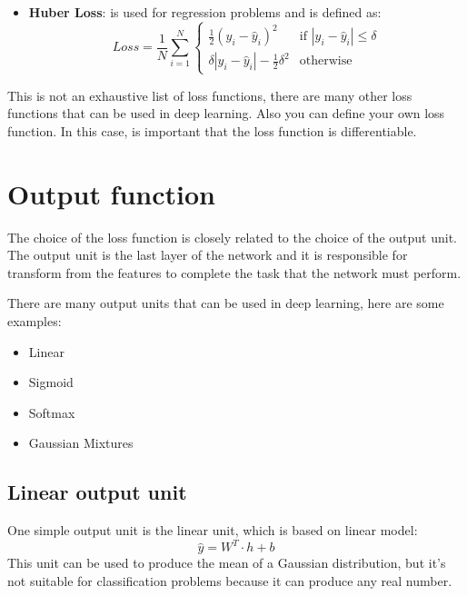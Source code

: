 \begin{itemize}
\begin{itemize}
              \item \textbf{Huber Loss}: is used for regression problems and is
                    defined as:
                    \begin{equation}
                        Loss = \frac{1}{N} \sum_{i=1}^N \begin{cases}
                            \frac{1}{2}(y_i - \hat{y}_i)^2                  & \text{if } |y_i - \hat{y}_i| \leq \delta \\
                            \delta |y_i - \hat{y}_i| - \frac{1}{2} \delta^2 & \text{otherwise}
                        \end{cases}
                    \end{equation}
          \end{itemize}
\end{itemize}
\begin{note}
    This is not an exhaustive list of loss functions, there are many other loss
    functions that can be used in deep learning. Also you can define your own loss
    function. In this case, is important that the loss function is differentiable.
\end{note}
\section{Output function}
The choice of the loss function is closely related to the choice of the output
unit. The output unit is the last layer of the network and it is responsible for
transform from the features to complete the task that the network must perform.

There are many output units that can be used in deep learning, here are some examples:
\begin{itemize}
    \item Linear
    \item Sigmoid
    \item Softmax
    \item Gaussian Mixtures
\end{itemize}
\subsection{Linear output unit}
One simple output unit is the linear unit, which is based on linear model:
\begin{equation}
    \hat{y} = W^T \cdot h + b
\end{equation}
This unit can be used to produce the mean of a Gaussian distribution, but it's
not suitable for classification problems because it can produce any real number.
